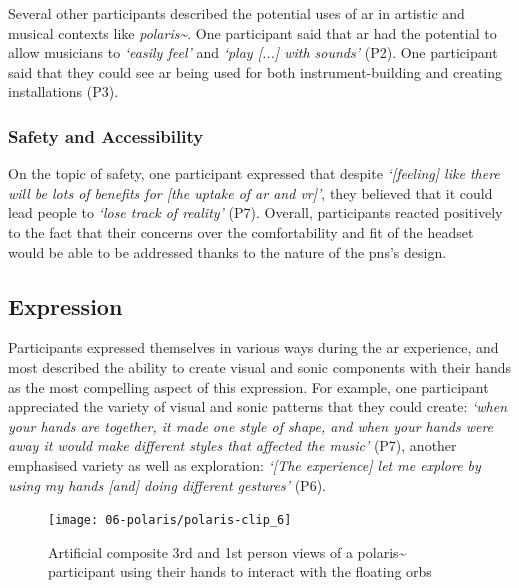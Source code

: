 Several other participants described the potential uses of \gls{ar} in artistic and musical contexts like \textit{polaris\textasciitilde{}}. One participant said that \gls{ar} had the potential to allow musicians to \textit{`easily feel'} and \textit{`play [...] with sounds'} (P2). One participant said that they could see \gls{ar} being used for both instrument-building and creating installations (P3).

\subsubsection{Safety and Accessibility}\label{sec: polaris-feedback-adoption-safety}
On the topic of safety, one participant expressed that despite \textit{`[feeling] like there will be lots of benefits for [the uptake of \gls{ar} and \gls{vr}]'}, they believed that it could lead people to \textit{`lose track of reality'} (P7). Overall, participants reacted positively to the fact that their concerns over the comfortability and fit of the headset would be able to be addressed thanks to the  nature of the \gls{pns}'s design.

\subsection{Expression}\label{sec: polaris-feedback-expression}
Participants expressed themselves in various ways during the \gls{ar} experience, and most described the ability to create visual and sonic components with their hands as the most compelling aspect of this expression. For example, one participant appreciated the variety of visual and sonic patterns that they could create: \textit{`when your hands are together, it made one style of shape, and when your hands were away it would make different styles that affected the music'} (P7), another emphasised variety as well as exploration: \textit{`[The experience] let me explore by using my hands [and] doing different gestures'} (P6).

\begin{figure}[ht]
    \centering
    \texttt{[image: 06-polaris/polaris-clip\_6]}
    \captionsetup{justification=centering,margin=1.5cm}
    \caption{Artificial composite 3rd and 1st person views of a polaris\textasciitilde{} participant using their hands to interact with the floating orbs \citep[from][\href{https://youtu.be/T7CAjPk2Zs0}{at 0:00}]{bilbow2022}}\label{fig: polaris-clip_6}
\end{figure}

